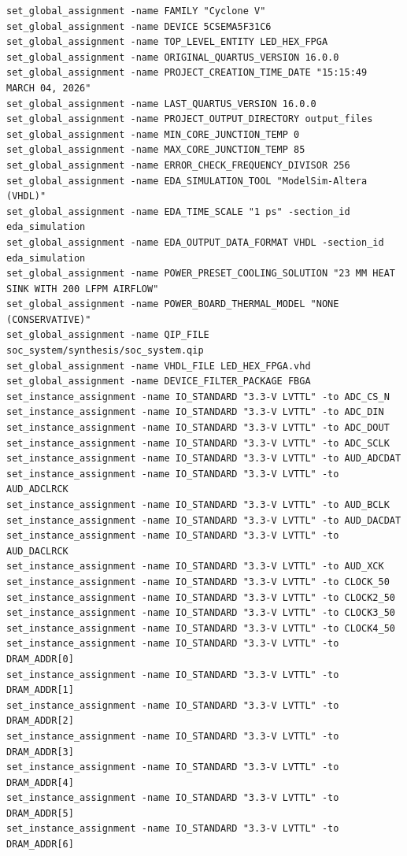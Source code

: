 \documentclass[conference]{IEEEtran}
\begin{document}
\begin{lstlisting}
set_global_assignment -name FAMILY "Cyclone V"
set_global_assignment -name DEVICE 5CSEMA5F31C6
set_global_assignment -name TOP_LEVEL_ENTITY LED_HEX_FPGA
set_global_assignment -name ORIGINAL_QUARTUS_VERSION 16.0.0
set_global_assignment -name PROJECT_CREATION_TIME_DATE "15:15:49  MARCH 04, 2026"
set_global_assignment -name LAST_QUARTUS_VERSION 16.0.0
set_global_assignment -name PROJECT_OUTPUT_DIRECTORY output_files
set_global_assignment -name MIN_CORE_JUNCTION_TEMP 0
set_global_assignment -name MAX_CORE_JUNCTION_TEMP 85
set_global_assignment -name ERROR_CHECK_FREQUENCY_DIVISOR 256
set_global_assignment -name EDA_SIMULATION_TOOL "ModelSim-Altera (VHDL)"
set_global_assignment -name EDA_TIME_SCALE "1 ps" -section_id eda_simulation
set_global_assignment -name EDA_OUTPUT_DATA_FORMAT VHDL -section_id eda_simulation
set_global_assignment -name POWER_PRESET_COOLING_SOLUTION "23 MM HEAT SINK WITH 200 LFPM AIRFLOW"
set_global_assignment -name POWER_BOARD_THERMAL_MODEL "NONE (CONSERVATIVE)"
set_global_assignment -name QIP_FILE soc_system/synthesis/soc_system.qip
set_global_assignment -name VHDL_FILE LED_HEX_FPGA.vhd
set_global_assignment -name DEVICE_FILTER_PACKAGE FBGA
set_instance_assignment -name IO_STANDARD "3.3-V LVTTL" -to ADC_CS_N
set_instance_assignment -name IO_STANDARD "3.3-V LVTTL" -to ADC_DIN
set_instance_assignment -name IO_STANDARD "3.3-V LVTTL" -to ADC_DOUT
set_instance_assignment -name IO_STANDARD "3.3-V LVTTL" -to ADC_SCLK
set_instance_assignment -name IO_STANDARD "3.3-V LVTTL" -to AUD_ADCDAT
set_instance_assignment -name IO_STANDARD "3.3-V LVTTL" -to AUD_ADCLRCK
set_instance_assignment -name IO_STANDARD "3.3-V LVTTL" -to AUD_BCLK
set_instance_assignment -name IO_STANDARD "3.3-V LVTTL" -to AUD_DACDAT
set_instance_assignment -name IO_STANDARD "3.3-V LVTTL" -to AUD_DACLRCK
set_instance_assignment -name IO_STANDARD "3.3-V LVTTL" -to AUD_XCK
set_instance_assignment -name IO_STANDARD "3.3-V LVTTL" -to CLOCK_50
set_instance_assignment -name IO_STANDARD "3.3-V LVTTL" -to CLOCK2_50
set_instance_assignment -name IO_STANDARD "3.3-V LVTTL" -to CLOCK3_50
set_instance_assignment -name IO_STANDARD "3.3-V LVTTL" -to CLOCK4_50
set_instance_assignment -name IO_STANDARD "3.3-V LVTTL" -to DRAM_ADDR[0]
set_instance_assignment -name IO_STANDARD "3.3-V LVTTL" -to DRAM_ADDR[1]
set_instance_assignment -name IO_STANDARD "3.3-V LVTTL" -to DRAM_ADDR[2]
set_instance_assignment -name IO_STANDARD "3.3-V LVTTL" -to DRAM_ADDR[3]
set_instance_assignment -name IO_STANDARD "3.3-V LVTTL" -to DRAM_ADDR[4]
set_instance_assignment -name IO_STANDARD "3.3-V LVTTL" -to DRAM_ADDR[5]
set_instance_assignment -name IO_STANDARD "3.3-V LVTTL" -to DRAM_ADDR[6]

\end{lstlisting}
\end{document}
